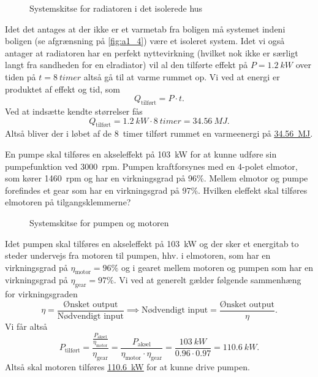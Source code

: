 \documentclass[a4paper]{article}
\begin{document}
\begin{figure}[ht]
    \centering
    \caption{Systemskitse for radiatoren i det isolerede hus}
    \label{fig:a1_4}
\end{figure}

Idet det antages at der ikke er et varmetab fra boligen må systemet indeni boligen (se afgrænsning på \autoref{fig:a1_4}) være et isoleret system. Idet vi også antager at radiatoren har en perfekt nyttevirkning (hvilket nok ikke er særligt langt fra sandheden for en elradiator) vil al den tilførte effekt på $P = \qty{1,2}{kW}$ over tiden på $t = \qty{8}{timer}$ altså gå til at varme rummet op. Vi ved at energi er produktet af effekt og tid, som
\[ 
Q_{\text{tilført}} = P \cdot t
.\]
Ved at indsætte kendte størrelser fås
\[ 
Q_{\text{tilført}} = \qty{1,2}{kW} \cdot \qty{8}{timer} = \qty{34,56}{MJ} 
.\]
Altså bliver der i løbet af de \qty{8}{timer} tilført rummet en varmeenergi på \underline{\underline{\qty{34,56}{MJ}}}.

\clearpage

En pumpe skal tilføres en akseleffekt på \qty{103}{kW} for at kunne udføre sin pumpefunktion ved \qty{3000}{rpm}. Pumpen kraftforsynes med en 4-polet elmotor, som kører \qty{1460}{rpm} og har en virkningsgrad på 96\%. Mellem elmotor og pumpe forefindes et gear som har en virkningsgrad på 97\%. Hvilken eleffekt skal tilføres elmotoren på tilgangsklemmerne? 

\begin{figure}[ht]
    \centering
    \caption{Systemskitse for pumpen og motoren}
    \label{fig:a1_5}
\end{figure}

Idet pumpen skal tilføres en akseleffekt på \qty{103}{kW} og der sker et energitab to steder undervejs fra motoren til pumpen, hhv. i elmotoren, som har en virkningsgrad på $\eta_{\mathrm{motor}} = 96\%$ og i gearet mellem motoren og pumpen som har en virkningsgrad på $\eta_{\mathrm{gear}} = 97\%$. Vi ved at generelt gælder følgende sammenhæng for virkningsgraden
\[ 
\eta = \frac{\text{Ønsket output}}{\text{Nødvendigt input}} \implies \text{Nødvendigt input} = \frac{\text{Ønsket output}}{\eta}
.\]
Vi får altså
\[ 
  P_{\text{tilført}} = \frac{\frac{P_{\mathrm{aksel}}}{\eta_{\mathrm{motor}}}}{\eta_{\mathrm{gear}}} = \frac{P_{\mathrm{aksel}}}{\eta_{\mathrm{motor}} \cdot \eta_{\mathrm{gear}}} = \frac{\qty{103}{kW}}{\num{0,96} \cdot \num{0,97}} = \qty{110,6}{kW} 
.\]
Altså skal motoren tilføres \underline{\underline{\qty{110,6}{kW}}} for at kunne drive pumpen.
\end{document}
